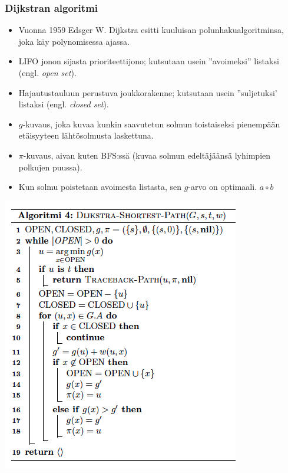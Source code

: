 \documentclass{beamer}
\begin{document}
\begin{frame}
  \frametitle{Dijkstran algoritmi}
  \begin{itemize}
    \item Vuonna 1959 Edsger W. Dijkstra esitti kuuluisan polunhakualgoritminsa, joka käy polynomisessa ajassa.
    \item LIFO jonon sijasta prioriteettijono; kutsutaan usein ''avoimeksi'' listaksi (engl. \textit{open set}).
    \item Hajautustauluun perustuva joukkorakenne; kutsutaan usein ''suljetuksi' listaksi (engl. \textit{closed set}).
    \item $g$-kuvaus, joka kuvaa kunkin saavutetun solmun toistaiseksi pienempään etäisyyteen lähtösolmusta laskettuna.
    \item $\pi$-kuvaus, aivan kuten BFS:ssä (kuvaa solmun edeltäjäänsä lyhimpien polkujen puussa).
    \item Kun solmu poistetaan avoimesta listasta, sen $g$-arvo on optimaali. $a \circ b$
  \end{itemize}
\end{frame}

\begin{frame}
  \includegraphics[width=\textwidth,height=\textheight,keepaspectratio]{dijkstra}
\end{frame}
\end{document}
